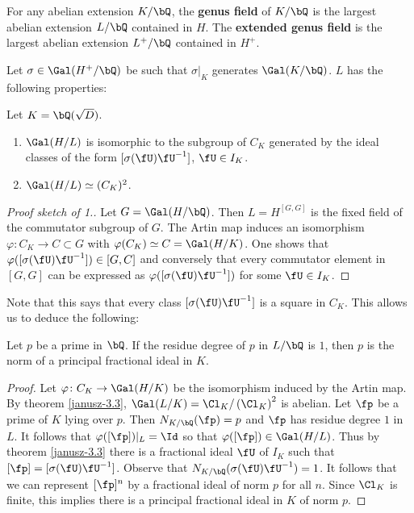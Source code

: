 \begin{defn}
    For any abelian extension $K / \bQ$, the \textbf{genus field} of $K / \bQ$ is the largest abelian extension $L / \bQ$ contained in $H$. The \textbf{extended genus field } is the largest abelian extension $L^{+} / \bQ $ contained in $H^{+}$.
\end{defn}

Let $\sigma \in \Gal(H^{+} / \bQ)$ be such that $\sigma|_{K}$ generates $\Gal(K / \bQ)$. $L$ has the following properties:

\begin{thm}\cite[Ch. VI, $\S$3, Theorem 3.3]{Janusz}\label{janusz-3.3}
    Let $K = \bQ(\sqrt{D})$.
    \begin{enumerate}
        \item $\Gal(H / L)$ is isomorphic to the subgroup of $C_K$ generated by the ideal classes of the form $[\sigma(\fU)\fU^{-1}]$, $\fU \in I_K$. 
        \item $\Gal(H / L) \simeq (C_K)^2$. 
    \end{enumerate}
\end{thm}

\begin{proof}[Proof sketch of 1.]
    Let $G = \Gal(H / \bQ)$. Then $L = H^{[G, G]}$ is the fixed field of the commutator subgroup of $G$. The Artin map induces an isomorphism $\varphi \colon C_K \to C \subset G$ with $\varphi(C_K) \simeq C = \Gal(H / K)$. One shows that $\varphi([\sigma(\fU)\fU^{-1}]) \in [G, C]$ and conversely that every commutator element in $[G, G]$ can be expressed as $\varphi([\sigma(\fU)\fU^{-1}])$ for some $\fU \in I_K$. 
\end{proof}

Note that this says that every class $[\sigma(\fU) \fU^{-1}]$ is a square in $C_K$.
This allows us to deduce the following:

\begin{thm}\label{p-principal}
Let $p$ be a prime in $\bQ$. If the residue degree of $p$ in $L / \bQ$ is $1$, then $p$ is the norm of a principal fractional ideal in $K$. 
\end{thm} 

\begin{proof}
Let $\varphi \colon C_K \to \Gal(H / K)$ be the isomorphism induced by the Artin map. By theorem \ref{janusz-3.3}, $\Gal(L / K) = \Cl_K / \left(\Cl_K\right)^2$ is abelian. Let $\fp$ be a prime of $K$ lying over $p$. Then $N_{K / \bQ}(\fp) = p$ and $\fp$ has residue degree $1$ in $L$. It follows that $\varphi([\fp])|_{L} = \Id$ so that $\varphi([\fp]) \in \Gal(H / L)$. Thus by theorem \ref{janusz-3.3} there is a fractional ideal $\fU$ of $I_K$ such that 
$[\fp] = [\sigma(\fU)\fU^{-1}]$. Observe that $N_{K / \bQ}(\sigma(\fU)\fU^{-1}) = 1$. It follows that we can represent $[\fp]^n$ by a fractional ideal of norm $p$ for all $n$. Since $\Cl_K$ is finite, this implies there is a principal fractional ideal in $K$ of norm $p$. 
\end{proof}

